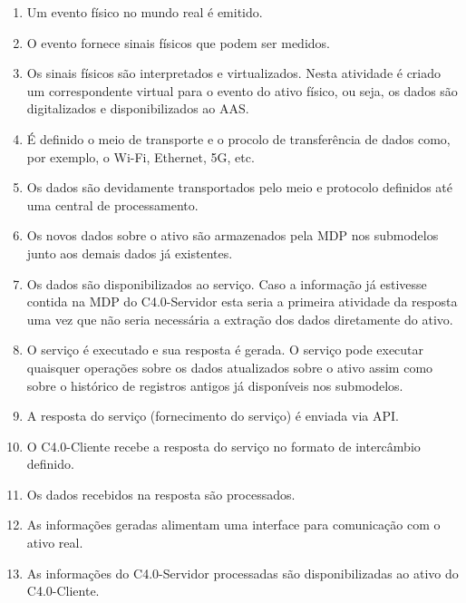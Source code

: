 	\begin{enumerate}
		
		\item Um evento físico no mundo real é emitido.
		
		\item O evento fornece sinais físicos que podem ser medidos.
		 
		\item Os sinais físicos são interpretados e virtualizados. Nesta atividade é criado um correspondente virtual para o evento do ativo físico, ou seja, os dados são digitalizados e disponibilizados ao AAS.
		
		\item É definido o meio de transporte e o procolo de transferência de dados como, por exemplo, o Wi-Fi, Ethernet, 5G, etc.
		
		\item Os dados são devidamente transportados pelo meio e protocolo definidos até uma central de processamento.
		
		\item Os novos dados sobre o ativo são armazenados pela MDP nos submodelos junto aos demais dados já existentes.
		
		\item Os dados são disponibilizados ao serviço. Caso a informação já estivesse contida na MDP do C4.0-Servidor esta seria a primeira atividade da resposta uma vez que não seria necessária a extração dos dados diretamente do ativo.
		
		\item O serviço é executado e sua resposta é gerada. O serviço pode executar quaisquer operações sobre os dados atualizados sobre o ativo assim como sobre o histórico de registros antigos já disponíveis nos submodelos.
		
		\item A resposta do serviço (fornecimento do serviço) é enviada via API.
		
		\item O C4.0-Cliente recebe a resposta do serviço no formato de intercâmbio definido.
		
		\item Os dados recebidos na resposta são processados.
		
		\item As informações geradas alimentam uma interface para comunicação com o ativo real.
		
		\item As informações do C4.0-Servidor processadas são disponibilizadas ao ativo do C4.0-Cliente.
	\end{enumerate}
